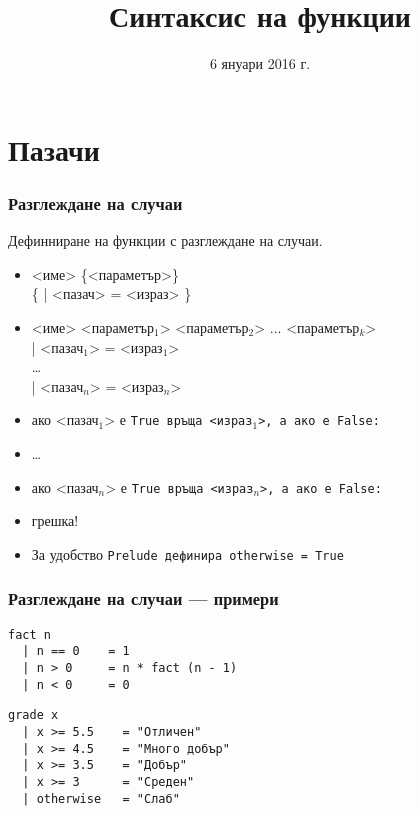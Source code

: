 \documentclass{beamer}
\title{Синтаксис на функции}
\date{6 януари 2016 г.}
\begin{document}
\begin{frame}
  \titlepage
\end{frame}


\section{Пазачи}

\begin{frame}[fragile]
  \frametitle{Разглеждане на случаи}
  Дефинниране на функции с разглеждане на случаи.
  \begin{itemize}
    \item{} <име> \{<параметър>\}\\
      \hspace{3ex} \{ \tta| <пазач> \tta= <израз> \}
      \pause
    \item{} <име> <параметър$_1$> <параметър$_2$> ... <параметър$_k$>\\
      \hspace{3ex} \tta| <пазач$_1$> \tta= <израз$_1$>\\
      \ldots\\
      \hspace{3ex} \tta| <пазач$_n$> \tta= <израз$_n$>\\
      \pause
  \item ако <пазач$_1$> е \tt{True} връща <израз$_1$>, а ако е \tt{False}:
  \item \ldots
  \item ако <пазач$_n$> е \tt{True} връща <израз$_n$>, а ако е \tt{False}:
  \item \alert{грешка!}
    \pause
  \item За удобство \tt{Prelude} дефинира \tt{otherwise = True}
  \end{itemize}
\end{frame}

\begin{frame}[fragile]
  \frametitle{Разглеждане на случаи --- примери}
\begin{verbatim}
fact n
  | n == 0    = 1
  | n > 0     = n * fact (n - 1)
  | n < 0     = 0
\end{verbatim}
\pause\vspace{1em}
\begin{verbatim}
grade x
  | x >= 5.5    = "Отличен"
  | x >= 4.5    = "Много добър"
  | x >= 3.5    = "Добър"
  | x >= 3      = "Среден"
  | otherwise   = "Слаб"
\end{verbatim}
\end{frame}
\end{document}
